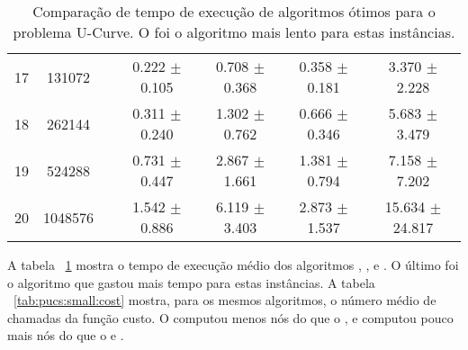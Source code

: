 \begin{table}
\begin{tabular}{cc c cccc}
17 &  131072 &&  0.222 $\pm$ 0.105 & 0.708 $\pm$ 0.368 & 0.358 $\pm$ 0.181 & 3.370 $\pm$ 2.228 \\
18 &  262144 &&  0.311 $\pm$ 0.240 & 1.302 $\pm$ 0.762 & 0.666 $\pm$ 0.346 & 5.683 $\pm$ 3.479 \\
19 &  524288 &&  0.731 $\pm$ 0.447 & 2.867 $\pm$ 1.661 & 1.381 $\pm$ 0.794 & 7.158 $\pm$ 7.202 \\
20 & 1048576 &&  1.542 $\pm$ 0.886 & 6.119 $\pm$ 3.403 & 2.873 $\pm$ 1.537 & 15.634 $\pm$ 24.817 \\
\bottomrule
\end{tabular}
\caption{Comparação de tempo de execução de algoritmos ótimos para o
problema U-Curve. O  foi o algoritmo mais lento para 
estas instâncias.}
\label{tab:pucs:small:time}
\end{table}


A tabela ~\ref{tab:pucs:small:time} mostra o tempo de execução médio
dos algoritmos , ,  e
. O último foi o algoritmo que gastou mais tempo para 
estas instâncias. A tabela ~\ref{tab:pucs:small:cost} mostra, para os
mesmos algoritmos, o número médio de chamadas da função custo. O
 computou menos nós do que o , e computou
pouco mais nós do que o  e .


